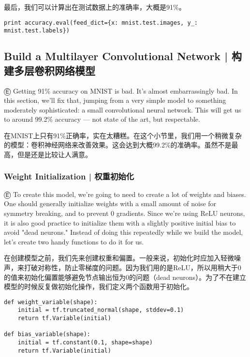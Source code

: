 最后，我们可以计算出在测试数据上的准确率，大概是91\%。

\begin{lstlisting}
print accuracy.eval(feed_dict={x: mnist.test.images, y_: mnist.test.labels})
\end{lstlisting}

%
\subsection{Build a Multilayer Convolutional Network  |  构建多层卷积网络模型}

Ⓔ \textcolor{etc}{Getting 91\% accuracy on MNIST is bad. It's almost embarrassingly bad. In this section, we'll fix that, jumping from a very simple model to something moderately sophisticated: a small convolutional neural network. This will get us to around 99.2\% accuracy --- not state of the art, but respectable.}

在MNIST上只有91\%正确率，实在太糟糕。在这个小节里，我们用一个稍微复杂的模型：卷积神经网络来改善效果。这会达到大概99.2\%的准确率。虽然不是最高，但是还是比较让人满意。

%
\subsubsection{Weight Initialization | 权重初始化}

Ⓔ \textcolor{etc}{To create this model, we're going to need to create a lot of weights and biases. One should generally initialize weights with a small amount of noise for symmetry breaking, and to prevent 0 gradients. Since we're using ReLU neurons, it is also good practice to initialize them with a slightly positive initial bias to avoid "dead neurons." Instead of doing this repeatedly while we build the model, let's create two handy functions to do it for us.}

在创建模型之前，我们先来创建权重和偏置。一般来说，初始化时应加入轻微噪声，来打破对称性，防止零梯度的问题。因为我们用的是ReLU，所以用稍大于0的值来初始化偏置能够避免节点输出恒为0的问题（dead neurons）。为了不在建立模型的时候反复做初始化操作，我们定义两个函数用于初始化。

\begin{lstlisting}
def weight_variable(shape):
    initial = tf.truncated_normal(shape, stddev=0.1)
    return tf.Variable(initial)

def bias_variable(shape):
    initial = tf.constant(0.1, shape=shape)
    return tf.Variable(initial)
\end{lstlisting}


